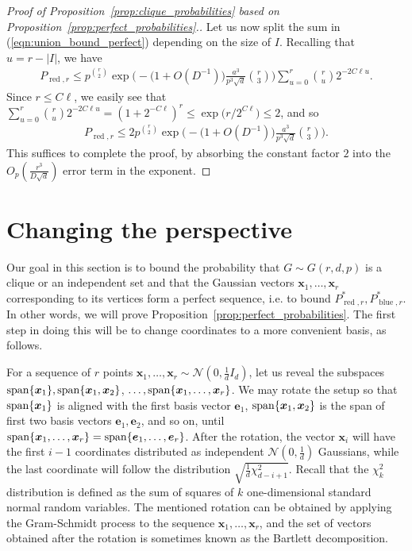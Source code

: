 \documentclass[11pt]{amsart}
\theoremstyle{definition}
\def\cN{\mathcal{N}}
\def\be{\boldsymbol{e}}
\def\bx{\boldsymbol{x}}
\DeclareMathOperator{\red}{red}
\DeclareMathOperator{\blue}{blue}
\begin{document}
\begin{proof}[Proof of Proposition~\ref{prop:clique_probabilities} based on Proposition~\ref{prop:perfect_probabilities}.]
Let us now split the sum in (\ref{eqn:union_bound_perfect}) depending on the size of $I$. Recalling that $u=r-|I|$, we have
{\smaller[0.3]
\begin{align*}
    P_{\red, r}\leq p^{\binom{r}{2}}\exp\bigg(-\big(1+O(D^{-1})\big)\frac{a^3}{p^3\sqrt{d}}\binom{r}{3}\bigg)\sum_{u=0}^{r} \binom{r}{u} 2^{-2C\ell u}.
\end{align*}
}
Since $r\leq C\ell$, we easily see that $\sum_{u=0}^{r} \binom{r}{u} 2^{-2C\ell u}= (1+2^{-C\ell})^{r}\leq \exp\big(r/2^{C\ell}\big)\le 2$, and so
{\smaller[0.3]
\begin{align*}
    P_{\red, r}\leq  2p^{\binom{r}{2}}\exp\Big(-\big(1+O(D^{-1})\big)\frac{a^3}{p^3\sqrt{d}}\binom{r}{3}\Big).
\end{align*}
}
This suffices to complete the proof, by absorbing the constant factor $2$ into the $O_p(\frac{r^3}{D\sqrt{d}})$ error term in the exponent.
\end{proof}

\section{Changing the perspective}\label{sec:induction}

Our goal in this section is to bound the probability that $G\sim G(r, d, p)$ is a clique or an independent set and that the Gaussian vectors $\bx_1, \dots, \bx_r$ corresponding to its vertices form a perfect sequence, i.e. to bound $P_{\red, r}^*, P_{\blue, r}^*$. In other words, we will prove Proposition~\ref{prop:perfect_probabilities}. The first step in doing this will be to change coordinates to a more convenient basis, as follows.

For a sequence of $r$ points $\bx_1, \dots, \bx_r\sim \cN(0, \frac{1}{d}I_d)$, let us reveal the subspaces ${\rm span}\{\bx_1\}, {\rm span}\{\bx_1, \bx_2\}$, $\dots, {\rm span}\{\bx_1, \dots, \bx_r\}$. We may rotate the setup so that ${\rm span}\{\bx_1\}$ is aligned with the first basis vector $\be_1$, ${\rm span}\{\bx_1, \bx_2\}$ is the span of first two basis vectors $\be_1, \be_2$, and so on, until ${\rm span}\{\bx_1, \dots, \bx_r\}={\rm span}\{\be_1, \dots, \be_r\}$. After the rotation, the vector $\bx_i$ will have the first $i-1$ coordinates distributed as independent $\cN(0, \frac{1}{d})$ Gaussians, while the last coordinate will follow the distribution $\sqrt{\frac{1}{d}\chi_{d-i+1}^2}$. Recall that the $\chi_k^2$ distribution is defined as the sum of squares of $k$ one-dimensional standard normal random variables. The mentioned rotation can be obtained by applying the Gram-Schmidt process to the sequence $\bx_1, \dots, \bx_r$, and the set of vectors obtained after the rotation is sometimes known as the Bartlett decomposition.
\end{document}
